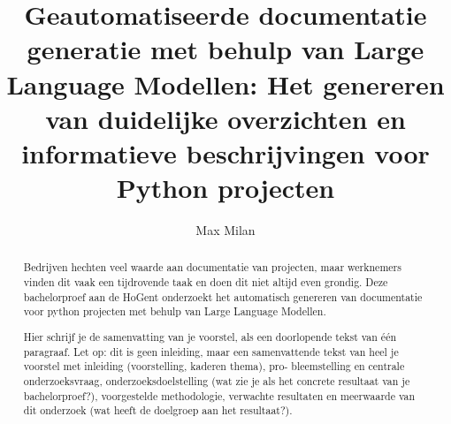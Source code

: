 \documentclass{hogent-article}
\title{Geautomatiseerde documentatie generatie met behulp van Large Language Modellen: Het genereren van duidelijke overzichten en informatieve beschrijvingen voor Python projecten}
\author{Max Milan}
\begin{document}
\begin{abstract}
Bedrijven hechten veel waarde aan documentatie van projecten, maar werknemers vinden dit vaak een tijdrovende taak en doen dit niet altijd even grondig.
Deze bachelorproef aan de HoGent onderzoekt het automatisch genereren van documentatie voor python projecten met behulp van Large Language Modellen.




Hier schrijf je de samenvatting van je voorstel, als een doorlopende tekst van één paragraaf. Let op: dit is geen
inleiding, maar een samenvattende tekst van heel je voorstel met inleiding (voorstelling, kaderen thema), pro-
bleemstelling en centrale onderzoeksvraag, onderzoeksdoelstelling (wat zie je als het concrete resultaat van je
bachelorproef?), voorgestelde methodologie, verwachte resultaten en meerwaarde van dit onderzoek (wat heeft
de doelgroep aan het resultaat?).

\end{abstract}

\tableofcontents



\printbibliography[heading=bibintec]
\end{document}
